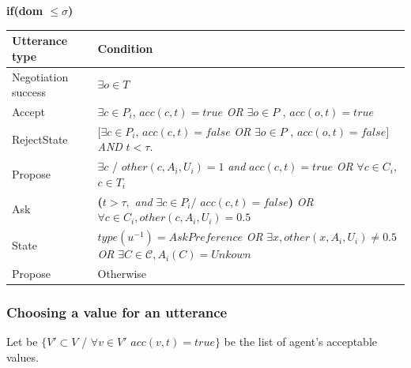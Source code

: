 \documentclass{llncs}
\begin{document}
		
		\textbf{if(\textbf{dom  $ \leq \sigma$})} 
		\begin{table}
			\centering
		\begin{tabular}{|p{3cm}|p{9cm}|}
			\hline
			\textbf{Utterance type} & Condition \\
			\hline
			Negotiation success &  $\exists o \in T$ \\
			\hline
			Accept & $\exists c \in P_i$, $acc(c, t)=true $ \newline \emph{OR}   \newline $ \exists o \in P$ ,  $acc(o, t) =true$ \\
			\hline
			RejectState & $ [\exists c \in P_i$, $acc(c, t)= false $  \emph{OR}   $ \exists o \in P$ ,  $acc(o, t)=false]$ \newline  \emph{AND} $t<\tau$.\\
			\hline
			Propose & $\exists c$ / $other(c, A_i, U_i)  = 1 $  \emph{and}
			\newline $acc(c, t)=true$
			\newline \emph{OR}  
			\newline $\forall c \in C_i$,  $c \in T_i$\\
			\hline
			Ask &  \textbf{(}$t> \tau,$ \emph{and} 
			$\exists c \in P_i /$
			$ acc(c, t)=false$\textbf{) }
			\newline \emph{OR}
			\newline $ \forall c \in C_i,other(c, A_i, U_i)=0.5$ \\
			\hline
			
			State & $type(u^{-1}) = AskPreference$
			\newline \emph{OR}
			\newline $\exists x,other(x, A_i, U_i) \not = 0.5 $ 
			\newline \emph{OR}
			\newline $ \exists C \in \mathcal{C}, A_i(C) = Unkown$
			\\
			\hline
			Propose & Otherwise \\
			\hline
		\end{tabular}
			\end{table}
		
		\subsubsection{Choosing a value for an utterance} 
		
		
		Let be $\{V' \subset V$ / $\forall v \in V'$ $ acc(v,t) = true\}$ be the list of agent's acceptable values. 
		
\end{document}
